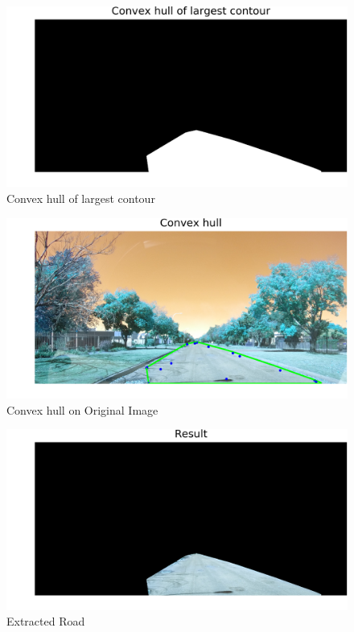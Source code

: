 \documentclass[journal]{IEEEtran}
\begin{document}
\begin{figure}[!htb]
\begin{center}
\includegraphics[scale=0.25]{Images/5_Convex_hull_of_largest_contour.png}
\end{center}
\caption{Convex hull of largest contour}
\end{figure}


\begin{figure}[!htb]
\begin{center}
\includegraphics[scale=0.25]{Images/6_Convex_hull.png}
\end{center}
\caption{Convex hull on Original Image}
\end{figure}


\begin{figure}[!htb]
\begin{center}
\includegraphics[scale=0.25]{Images/7_Result.png}
\end{center}
\caption{Extracted Road}
\end{figure}
\end{document}
